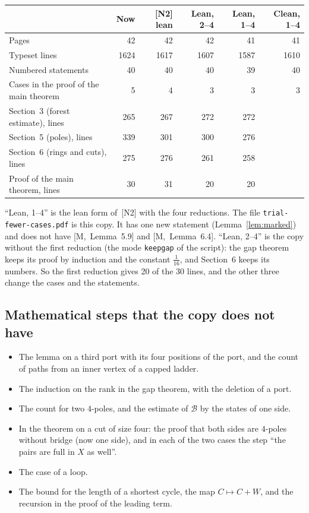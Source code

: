 \documentclass[11pt]{article}
\newcommand{\M}[1]{[M,~#1]}
\begin{document}
\begin{center}\small
\begin{tabular}{@{}p{5.3cm}rrrrr@{}}
\toprule
 & \textsf{\textbf{Now}} & \textsf{\textbf{[N2] lean}} & \textsf{\textbf{Lean, 2--4}} & \textsf{\textbf{Lean, 1--4}} & \textsf{\textbf{Clean, 1--4}}\\
\midrule
Pages & 42 & 42 & 42 & 41 & 41\\
Typeset lines & 1624 & 1617 & 1607 & 1587 & 1610\\
Numbered statements & 40 & 40 & 40 & 39 & 40\\
Cases in the proof of the main theorem & 5 & 4 & 3 & 3 & 3\\
Section~3 (forest estimate), lines & 265 & 267 & 272 & 272 & \\
Section~5 (poles), lines & 339 & 301 & 300 & 276 & \\
Section~6 (rings and cuts), lines & 275 & 276 & 261 & 258 & \\
Proof of the main theorem, lines & 30 & 31 & 20 & 20 & \\
\bottomrule
\end{tabular}
\end{center}

\noindent ``Lean, 1--4'' is the lean form of~[N2] with the four reductions. The file
\texttt{trial-fewer-cases.pdf} is this copy. It has one new statement
(Lemma~\ref{lem:marked}) and does not have \M{Lemma~5.9} and \M{Lemma~6.4}. ``Lean, 2--4'' is the copy without the first reduction
(the mode \texttt{keepgap} of the script): the gap theorem keeps its proof by induction and the
constant $\frac1{16}$, and Section~6 keeps its numbers. So the first reduction gives 20 of the 30
lines, and the other three change the cases and the statements.

\subsection{Mathematical steps that the copy does not have}

\begin{itemize}[leftmargin=1.2em]
\item The lemma on a third port with its four positions of the port, and the count of paths from
an inner vertex of a capped ladder.
\item The induction on the rank in the gap theorem, with the deletion of a port.
\item The count for two $4$-poles, and the estimate of $\mathcal B$ by the states of one side.
\item In the theorem on a cut of size four: the proof that both sides are $4$-poles without
bridge (now one side), and in each of the two cases the step ``the pairs are full in $X$ as
well''.
\item The case of a loop.
\item The bound for the length of a shortest cycle, the map $C\mapsto C+W$, and the recursion in
the proof of the leading term.
\end{itemize}
\end{document}
